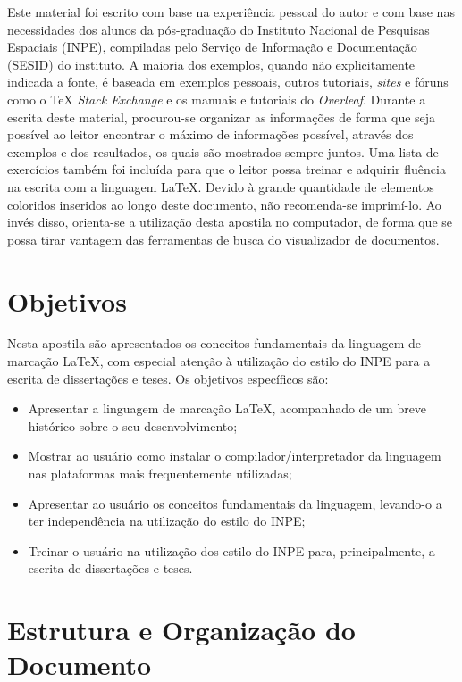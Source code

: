 Este material foi escrito com base na experiência pessoal do autor e com base nas necessidades dos alunos da pós-graduação do Instituto Nacional de Pesquisas Espaciais (INPE), compiladas pelo Serviço de Informação e Documentação (SESID) do instituto. A maioria dos exemplos, quando não explicitamente indicada a fonte, é baseada em exemplos pessoais, outros tutoriais, \textit{sites} e fóruns como o \TeX{} \textit{Stack Exchange} e os manuais e tutoriais do \textit{Overleaf}. Durante a escrita deste material, procurou-se organizar as informações de forma que seja possível ao leitor encontrar o máximo de informações possível, através dos exemplos e dos resultados, os quais são mostrados sempre juntos. Uma lista de exercícios também foi incluída para que o leitor possa treinar e adquirir fluência na escrita com a linguagem \LaTeX{}. Devido à grande quantidade de elementos coloridos inseridos ao longo deste documento, não recomenda-se imprimí-lo. Ao invés disso, orienta-se a utilização desta apostila no computador, de forma que se possa tirar vantagem das ferramentas de busca do visualizador de documentos.

\section{Objetivos}
\label{sec:objetivos}

Nesta apostila são apresentados os conceitos fundamentais da linguagem de marcação \LaTeX{}, com especial atenção à utilização do estilo do INPE para a escrita de dissertações e teses. Os objetivos específicos são:

\begin{itemize}
    \item Apresentar a linguagem de marcação \LaTeX{}, acompanhado de um breve histórico sobre o seu desenvolvimento;
    \item Mostrar ao usuário como instalar o compilador/interpretador da linguagem nas plataformas mais frequentemente utilizadas;
    \item Apresentar ao usuário os conceitos fundamentais da linguagem, levando-o a ter independência na utilização do estilo do INPE;
    \item Treinar o usuário na utilização dos estilo do INPE para, principalmente, a escrita de dissertações e teses.
\end{itemize}

\section{Estrutura e Organização do Documento}
\label{sec:estrutura}

